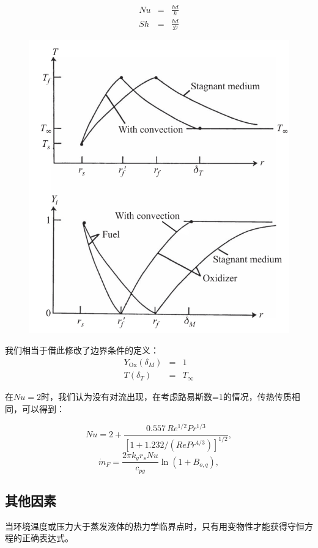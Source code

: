 \begin{eqnarray}
    Nu &=& \frac{h d}{k}\\
    Sh &=& \frac{h d}{\mathcal{D}}
\end{eqnarray}

\begin{figure}[H]
    \centering
    \includegraphics[width=.3\textwidth]{img/convect.png}
\end{figure}
我们相当于借此修改了边界条件的定义：
\begin{eqnarray}
    Y_\mathrm{Ox}(\delta_M) &=& 1\\
    T(\delta_T) &=& T_\infty
\end{eqnarray}

在\(Nu=2\)时，我们认为没有对流出现，在考虑路易斯数=1的情况，传热传质相同，可以得到：

\begin{equation}
    N u=2+\frac{0.557\,R e^{1/2}P r^{1/3}}{[1+1.232/(R e P r^{4/3})]^{1/2}},
\end{equation}
\begin{equation}
    \dot{m}_{F}=\frac{2\pi k_{g}r_{s}N u}{c_{p g}}\ln(1+B_{o,q}),
\end{equation}

\subsection{其他因素}
当环境温度或压力大于蒸发液体的热力学临界点时，只有用变物性才能获得守恒方程的正确表达式。

